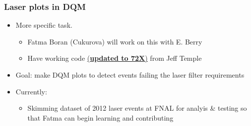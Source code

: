 \documentclass[bigger]{beamer}
\providecommand{\alert}[1]{\textbf{#1}}
\begin{document}
\begin{frame}
\frametitle{Laser plots in DQM}
\label{sec-1-1-3}
\begin{itemize}

\item More specific task.
\label{sec-1-1-3-1}%
\begin{itemize}

\item Fatma Boran (Cukurova) will work on this with E. Berry
\label{sec-1-1-3-1-1}%

\item Have working code \href{https://github.com/cms-sw/cmssw/tree/CMSSW_7_2_X/EventFilter/HcalRawToDigi/plugins}{(\alert{updated to 72X})} from Jeff Temple
\label{sec-1-1-3-1-2}%
\end{itemize} %

\item Goal: make DQM plots to detect events failing the laser filter requirements
\label{sec-1-1-3-2}%

\item Currently:
\label{sec-1-1-3-3}%
\begin{itemize}

\item Skimming dataset of 2012 laser events at FNAL for analyis \& testing so that Fatma can begin learning and contributing
\label{sec-1-1-3-3-1}%
\end{itemize} %
\end{itemize} %
\end{frame}
\end{document}
